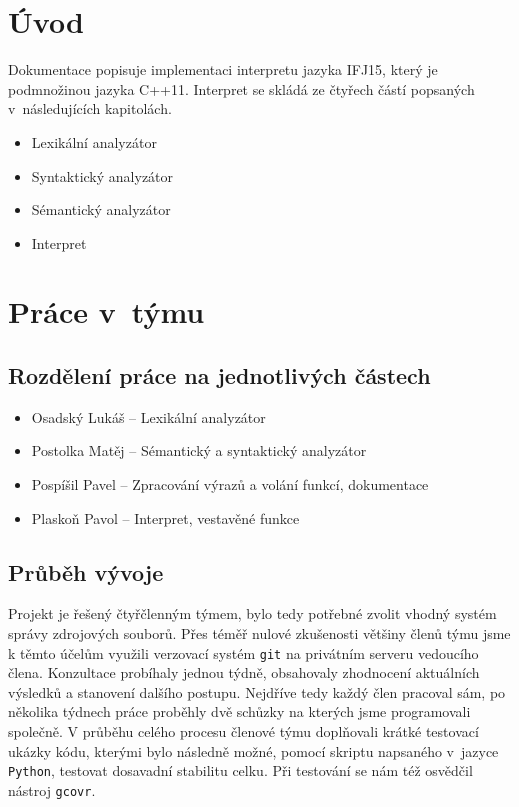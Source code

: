 \documentclass[a4paper, 12pt]{article}
\begin{document}
\tableofcontents
\newpage
\section{Úvod} \label{uvod}

Dokumentace popisuje implementaci interpretu jazyka IFJ15, který je
podmnožinou jazyka C++11. Interpret se skládá ze čtyřech částí
popsaných v~následujících kapitolách.

\begin{itemize}
	\item Lexikální analyzátor
	\item Syntaktický analyzátor
	\item Sémantický analyzátor
	\item Interpret
\end{itemize}
\section{Práce v~týmu} \label{team}

\subsection{Rozdělení práce na jednotlivých částech}
\begin{itemize}
	\item Osadský Lukáš -- Lexikální analyzátor
	\item Postolka Matěj -- Sémantický a syntaktický analyzátor
	\item Pospíšil Pavel -- Zpracování výrazů a volání funkcí, dokumentace
	\item Plaskoň Pavol -- Interpret, vestavěné funkce
\end{itemize}

\subsection{Průběh vývoje}
Projekt je řešený čtyřčlenným týmem, bylo tedy potřebné zvolit vhodný systém
správy zdrojových souborů. Přes téměř nulové zkušenosti většiny členů týmu jsme
k těmto účelům využili verzovací systém \texttt{git} na privátním serveru
vedoucího člena.
Konzultace probíhaly jednou týdně, obsahovaly zhodnocení aktuálních výsledků
a stanovení dalšího postupu. Nejdříve tedy každý člen pracoval sám, po několika
týdnech práce proběhly dvě schůzky na kterých jsme programovali společně.
V průběhu celého procesu členové týmu doplňovali krátké testovací ukázky kódu,
kterými bylo následně možné, pomocí skriptu napsaného v~jazyce \texttt{Python},
testovat dosavadní stabilitu celku. Při testování se nám též osvědčil nástroj
\texttt{gcovr}.
\end{document}
